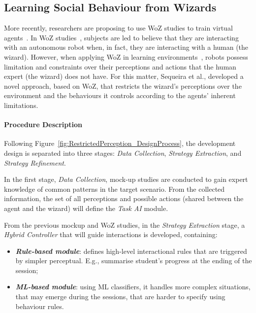 \subsection{Learning Social Behaviour from Wizards}
\label{subsec:RestrictedPerceptionsWOZStudy}

More recently, researchers are proposing to use \ac{WoZ} studies to train virtual agents~\cite{Knox2014, Mutlu2006}. In \ac{WoZ} studies~\cite{Steinfeld2009}, subjects are led to believe that they are interacting with an autonomous robot when, in fact, they are interacting with a human (the wizard). However, when applying \ac{WoZ} in learning environments~\cite{Knox2014}, robots possess limitation and constraints over their perceptions and actions that the human expert (the wizard) does not have. For this matter, Sequeira et al., developed a novel approach, based on \ac{WoZ}, that restricts the wizard's perceptions over the environment and the behaviours it controls according to the agents' inherent limitations.

\paragraph{\textbf{Procedure Description}}

Following Figure~\ref{fig:RestrictedPerception_DesignProcess}, the development design is separated into three stages: \textit{Data Collection}, \textit{Strategy Extraction}, and \textit{Strategy Refinement}.

In the first stage, \textit{Data Collection}, mock-up studies are conducted to gain expert knowledge of common patterns in the target scenario. From the collected information, the set of all perceptions and possible actions (shared between the agent and the wizard) will define the \textit{Task AI} module.

From the previous mockup and \ac{WoZ} studies, in the \textit{Strategy Extraction} stage, a \textit{Hybrid Controller} that will guide interactions is developed, containing:
\begin{itemize}
	\item \textbf{\textit{Rule-based module}}: defines high-level interactional rules that are triggered by simpler perceptual. E.g., summarise student's progress at the ending of the session;
	\item \textbf{\textit{\ac{ML}-based module}}: using \ac{ML} classifiers, it handles more complex situations, that may emerge during the sessions, that are harder to specify using behaviour rules.
\end{itemize}

